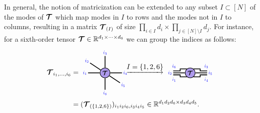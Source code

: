 In general, the notion of matricization can be extended to any subset $I\subset [N]$ of the modes of $\bm{\mathcal{T}}$ which map  modes in $I$  to rows and the modes not in $I$ to columns, resulting in a matrix $\bm{\mathcal{T}}_{(I)}$ of size $\prod_{i\in I} d_i \times \prod_{j\in [N]\setminus I} d_j$. For instance, for a sixth-order tensor $\bm{\mathcal{T}}\in\mathbb{R}^{d_1\times\dots\times d_6}$ we can group the indices as follows:
\begin{align*}
\Tt_{i_1,\dots,i_6} 
&=
\begin{tikzpicture}[baseline=\baseline]
    \tikzset{tensor/.style = {minimum size = 0.5cm,shape = circle,thick,draw=black,inner sep = 0pt}, edge/.style = {thick,line width=.4mm},every loop/.style={}}
    \def\y{0}
    \def\x{0}
    \node[tensor,fill=red!20!blue!40!white] (T) at (\x,\y){\scalebox{0.85}{$\Tt$}};
    \draw[edge] (T) -- (\x+0.85,\y) node [very near end,right]
    {\scalebox{0.7}{\indcolor{$i_4$}}};
    \draw[edge] (T) -- (\x,\y-0.85) node [very near end, below]
    {\scalebox{0.7}{\indcolor{$i_6$}}};
    \draw[edge] (T) -- (\x-0.85,\y)node [very near end,left]
    {\scalebox{0.7}{\indcolor{$i_1$}}};
    \draw[edge] (T) -- (\x,\y+0.85) node [very near end,above]
    {\scalebox{0.7}{\indcolor{$i_3$}}};
    \draw[edge] (T) -- (\x-0.75,\y+0.5) node [pos=1.3]
    {\scalebox{0.7}{\indcolor{$i_2$}}};
    \draw[edge] (T) -- (\x+0.75,\y-0.5) node [pos=1.3]
    {\scalebox{0.7}{\indcolor{$i_5$}}};
    \node[draw=none] at (\x+2,\y+0.2){$\underrightarrow{I=\{1,2,6\}}$};
    \end{tikzpicture}
\begin{tikzpicture}[baseline=\baseline]
    \tikzset{tensor/.style = {minimum size = 0.5cm,shape = circle,thick,draw=black,inner sep = 0pt}, edge/.style = {thick,line width=.4mm},every loop/.style={}}
    \def\y{0}
    \def\x{0}
    \node[tensor,fill=red!20!blue!40!white] (T) at (\x,\y){\scalebox{0.85}{$\Tt$}};
    \draw[edge](T) -- (\x+0.85,\y)node [very near end, right]{\scalebox{0.7}{\indcolor{$i_5$}}};
    \draw[edge](\x+0.16,\y+0.2) -- (\x+0.5,\y+0.2) -- (\x+0.5,\y+0.1) -- (\x+0.85,\y+0.1)node [very near end, above]{\scalebox{0.7}{\indcolor{$i_3$}}};
    \draw[edge](\x+0.16,\y-0.2) -- (\x+0.5,\y-0.2) -- (\x+0.5,\y-0.1) -- (\x+0.85,\y-0.1)node [very near end, below]{\scalebox{0.7}{\indcolor{$i_4$}}};
    \draw[edge](T) -- (\x-0.85,\y)node [very near end, left]{\scalebox{0.7}{\indcolor{$i_2$}}};
    \draw[edge](\x-0.16,\y+0.2) -- (\x-0.5,\y+0.2) -- (\x-0.5,\y+0.1) -- (\x-0.85,\y+0.1)node [very near end, above]{\scalebox{0.7}{\indcolor{$i_6$}}};
    \draw[edge](\x-0.16,\y-0.2) -- (\x-0.5,\y-0.2) -- (\x-0.5,\y-0.1) -- (\x-0.85,\y-0.1)node [very near end, below]{\scalebox{0.7}{\indcolor{$i_1$}}};
\end{tikzpicture}\\
&=
(\Tt_{(\{1,2,6\})})_{i_1i_2i_6 , i_3i_4i_5}\in\RR^{d_1d_2d_6\times d_3d_4d_5}.
\end{align*}
